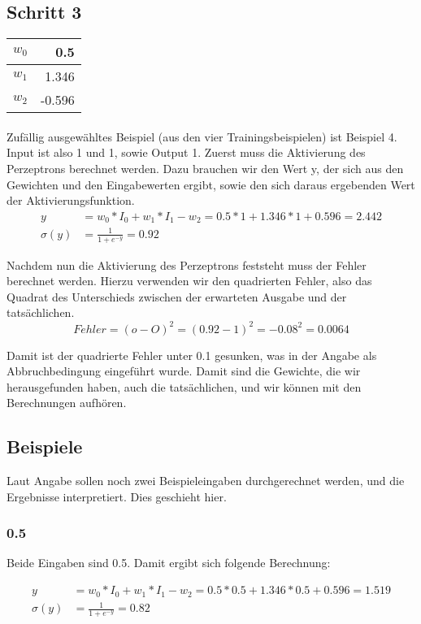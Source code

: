 \documentclass[a4paper]{article}
\begin{document}
\subsection{Schritt 3}
\begin{tabular}{|l|r|}
	\hline
	$w_0$ & 0.5 \\\hline
	$w_1$ & 1.346 \\\hline
	$w_2$ & -0.596 \\\hline
\end{tabular}
\paragraph{}
Zufällig ausgewähltes Beispiel (aus den vier Trainingsbeispielen) ist Beispiel 4. Input ist also 1 und 1, sowie Output 1.
Zuerst muss die Aktivierung des Perzeptrons berechnet werden. Dazu brauchen wir den Wert y, der sich aus den Gewichten und den Eingabewerten ergibt, sowie den sich daraus ergebenden Wert der Aktivierungsfunktion.
\begin{align*}
	y &= w_0 * I_0 + w_1 * I_1 - w_2 = 0.5 * 1 + 1.346 * 1 + 0.596 = 2.442 \\
	\sigma(y) &= \frac{1}{1 + e^{-y}} = 0.92
\end{align*}

Nachdem nun die Aktivierung des Perzeptrons feststeht muss der Fehler berechnet werden. Hierzu verwenden wir den quadrierten Fehler, also das Quadrat des Unterschieds zwischen der erwarteten Ausgabe und der tatsächlichen.
\[
	Fehler = (o - O)^2 = (0.92 - 1)^2 = -0.08^2 = 0.0064
\]

Damit ist der quadrierte Fehler unter 0.1 gesunken, was in der Angabe als Abbruchbedingung eingeführt wurde. Damit sind die Gewichte, die wir herausgefunden haben, auch die tatsächlichen, und wir können mit den Berechnungen aufhören.

\subsection{Beispiele}
Laut Angabe sollen noch zwei Beispieleingaben durchgerechnet werden, und die Ergebnisse interpretiert. Dies geschieht hier.

\subsubsection{0.5}
Beide Eingaben sind 0.5. Damit ergibt sich folgende Berechnung:

\begin{align*}
	y &= w_0 * I_0 + w_1 * I_1 - w_2 = 0.5 * 0.5 + 1.346 * 0.5 + 0.596 = 1.519 \\
	\sigma(y) &= \frac{1}{1 + e^{-y}} = 0.82
\end{align*}
\end{document}
